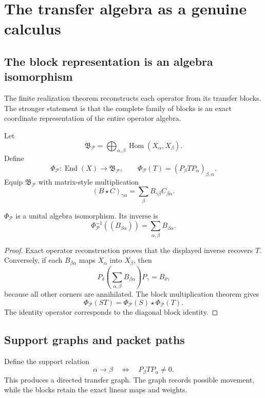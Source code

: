 \chapter{The transfer algebra as a genuine calculus}\label{ch:transfer-calculus}

\section{The block representation is an algebra isomorphism}
The finite realization theorem reconstructs each operator from its transfer blocks.  The stronger statement is that the complete family of blocks is an exact coordinate representation of the entire operator algebra.

Let
\[
\mathfrak B_{\mathcal P}
=
\bigoplus_{\alpha,\beta}
\operatorname{Hom}(X_\alpha,X_\beta).
\]
Define
\[
\Phi_{\mathcal P}:\operatorname{End}(X)\longrightarrow\mathfrak B_{\mathcal P},
\qquad
\Phi_{\mathcal P}(T)=(P_\beta TP_\alpha)_{\beta,\alpha}.
\]
Equip $\mathfrak B_{\mathcal P}$ with matrix-style multiplication
\[
(B\star C)_{\gamma\alpha}
=
\sum_\beta B_{\gamma\beta}C_{\beta\alpha}.
\]

\begin{theorem}\label{thm:block-algebra-iso}
$\Phi_{\mathcal P}$ is a unital algebra isomorphism.  Its inverse is
\[
\boxed{
\Phi_{\mathcal P}^{-1}((B_{\beta\alpha}))
=
\sum_{\alpha,\beta}B_{\beta\alpha}.
}
\]
\end{theorem}

\begin{proof}
Exact operator reconstruction proves that the displayed inverse recovers $T$.  Conversely, if each $B_{\beta\alpha}$ maps $X_\alpha$ into $X_\beta$, then
\[
P_\delta\left(\sum_{\alpha,\beta}B_{\beta\alpha}\right)P_\gamma
=B_{\delta\gamma}
\]
because all other corners are annihilated.  The block multiplication theorem gives
\[
\Phi_{\mathcal P}(ST)=\Phi_{\mathcal P}(S)\star\Phi_{\mathcal P}(T).
\]
The identity operator corresponds to the diagonal block identity.
\end{proof}

\section{Support graphs and packet paths}
Define the support relation
\[
\alpha\longrightarrow\beta
\quad\Longleftrightarrow\quad
P_\beta TP_\alpha\ne0.
\]
This produces a directed transfer graph.  The graph records possible movement, while the blocks retain the exact linear maps and weights.

